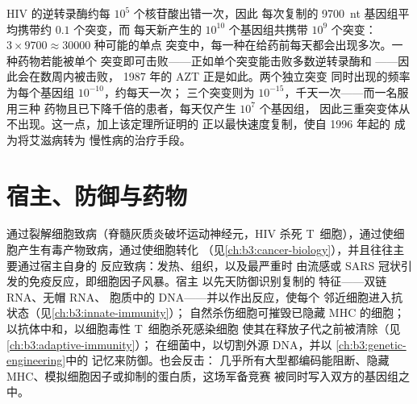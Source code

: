 \begin{example}\label{ex:b3:virology:three-drugs}
HIV 的逆转录酶约每 $10^{5}$ 个核苷酸出错一次，因此
每次复制的 \qty{9700}{nt} 基因组平均携带约 $0.1$ 个突变，而
每天新产生的 $10^{10}$ 个基因组共携带 $10^{9}$ 个突变：
$3\times 9700 \approx \num{30000}$ 种可能的单点
突变中，每一种在给药前每天都会出现多次。一种药物若能被单个
突变即可击败——正如单个突变能击败多数逆转录酶和
——因此会在数周内被击败，
1987 年的 AZT 正是如此。两个独立突变
同时出现的频率为每个基因组 $10^{-10}$，约每天一次；
三个突变则为 $10^{-15}$，千天一次——而一名服用三种
药物且已下降千倍的患者，每天仅产生 $10^{7}$ 个基因组，
因此三重突变体从不出现。这一点，加上该定理所证明的
正以最快速度复制，使自 1996 年起的
成为将艾滋病转为
慢性病的治疗手段。
\end{example}

\section{宿主、防御与药物}

\begin{proposition}[致病机制与防御]\label{prop:b3:virology:pathogenesis}
通过裂解细胞致病（脊髓灰质炎破坏运动神经元，HIV 杀死
T~细胞），通过使细胞产生有毒产物致病，通过使细胞转化
（见\cref{ch:b3:cancer-biology}），并且往往主要通过宿主自身的
反应致病：发热、组织，以及最严重时
由流感或 SARS 冠状引发的免疫反应，即细胞因子风暴。宿主
以先天防御识别复制的
特征——双链 RNA、无帽 RNA、
胞质中的 DNA——并以\emph{}作出反应，使每个
邻近细胞进入抗状态（见\cref{ch:b3:innate-immunity}）；
自然杀伤细胞可摧毁已隐藏 MHC 的细胞；
以抗体中和，以细胞毒性 T~细胞杀死感染细胞
使其在释放子代之前被清除（见\cref{ch:b3:adaptive-immunity}）；
在细菌中，以切割外源 DNA，并以
\cref{ch:b3:genetic-engineering}中的  记忆来防御。也会反击：
几乎所有大型都编码能阻断、隐藏
MHC、模拟细胞因子或抑制的蛋白质，这场军备竞赛
被同时写入双方的基因组之中。
\end{proposition}

